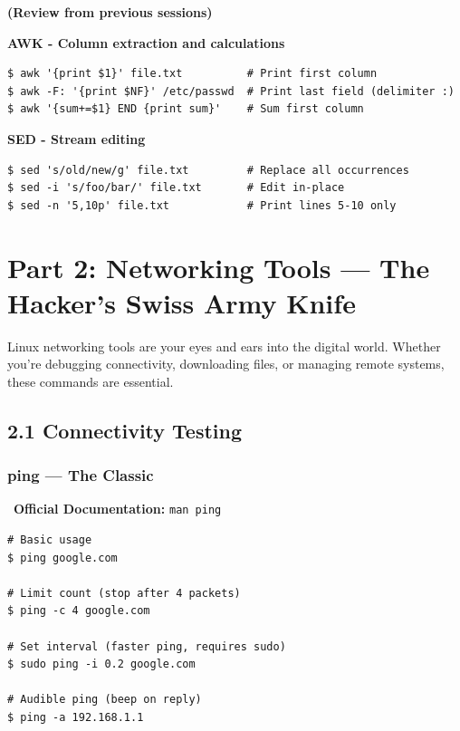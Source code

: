 \documentclass[12pt]{article}
\newcommand{\bookicon}{\faBook}
\begin{document}
\begin{infobox}
\textbf{(Review from previous sessions)}

\textbf{AWK - Column extraction and calculations}
\begin{verbatim}
$ awk '{print $1}' file.txt          # Print first column
$ awk -F: '{print $NF}' /etc/passwd  # Print last field (delimiter :)
$ awk '{sum+=$1} END {print sum}'    # Sum first column
\end{verbatim}

\textbf{SED - Stream editing}
\begin{verbatim}
$ sed 's/old/new/g' file.txt         # Replace all occurrences
$ sed -i 's/foo/bar/' file.txt       # Edit in-place
$ sed -n '5,10p' file.txt            # Print lines 5-10 only
\end{verbatim}
\end{infobox}

\section*{Part 2: Networking Tools — The Hacker's Swiss Army Knife}

Linux networking tools are your eyes and ears into the digital world. Whether you're debugging connectivity, downloading files, or managing remote systems, these commands are essential.

\subsection*{2.1 Connectivity Testing}

\subsubsection*{ping — The Classic}

\begin{infobox}
\bookicon\ \textbf{Official Documentation:} \texttt{man ping}
\end{infobox}

\begin{highlightbox}
\begin{verbatim}
# Basic usage
$ ping google.com

# Limit count (stop after 4 packets)
$ ping -c 4 google.com

# Set interval (faster ping, requires sudo)
$ sudo ping -i 0.2 google.com

# Audible ping (beep on reply)
$ ping -a 192.168.1.1
\end{verbatim}
\end{highlightbox}
\end{document}
